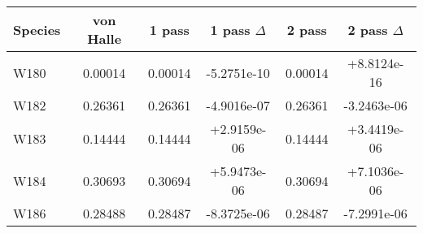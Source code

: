 \begin{tabular}{|l||c||c|c||c|c|}
\hline
\bf{Species} & \bf{von Halle} & \bf{1 pass} & \bf{1 pass $\Delta$} & \bf{2 pass} & \bf{2 pass $\Delta$} \\ 
\hline
W180 & 0.00014 & 0.00014 & -5.2751e-10 & 0.00014 & +8.8124e-16 \\ 
\hline
W182 & 0.26361 & 0.26361 & -4.9016e-07 & 0.26361 & -3.2463e-06 \\ 
\hline
W183 & 0.14444 & 0.14444 & +2.9159e-06 & 0.14444 & +3.4419e-06 \\ 
\hline
W184 & 0.30693 & 0.30694 & +5.9473e-06 & 0.30694 & +7.1036e-06 \\ 
\hline
W186 & 0.28488 & 0.28487 & -8.3725e-06 & 0.28487 & -7.2991e-06 \\ 
\hline
\end{tabular}
